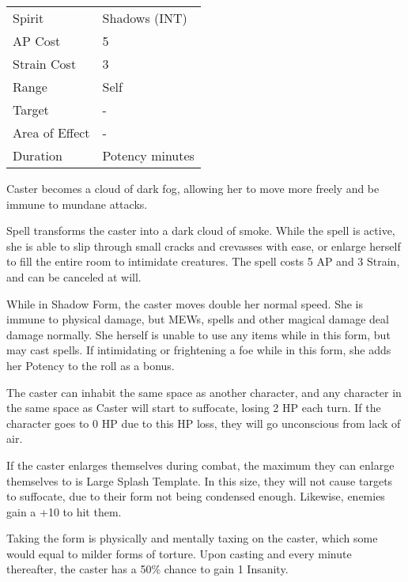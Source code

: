 \documentclass[11pt,a4paper,twocolumn]{book}
\begin{document}
{
	\begin{tabu} to 75mm{| X[l,4] | X[l,7] |}
		\hline
		Spirit 			& Shadows (INT) 		\\
		AP Cost	      	& 5 					\\
		Strain Cost     & 3 					\\
		Range     		& Self					\\
		Target      	& -						\\
		Area of Effect  & -  	 				\\
		Duration     	& Potency minutes		\\ \hline
	\end{tabu}
	
}

\medskip

Caster becomes a cloud of dark fog, allowing her to move more freely and be immune to mundane attacks. 	

Spell transforms the caster into a dark cloud of smoke. While the spell is active, she is able to slip through small cracks and crevasses with ease, or enlarge herself to fill the entire room to intimidate creatures. The spell costs 5 AP and 3 Strain, and can be canceled at will.

While in Shadow Form, the caster moves double her normal speed. She is immune to physical damage, but MEWs, spells and other magical damage deal damage normally. She herself is unable to use any items while in this form, but may cast spells. If intimidating or frightening a foe while in this form, she adds her Potency to the roll as a bonus.

The caster can inhabit the same space as another character, and any character in the same space as Caster will start to suffocate, losing 2 HP each turn. If the character goes to 0 HP due to this HP loss, they will go unconscious from lack of air.

If the caster enlarges themselves during combat, the maximum they can enlarge themselves to is Large Splash Template. In this size, they will not cause targets to suffocate, due to their form not being condensed enough. Likewise, enemies gain a +10 to hit them.

Taking the form is physically and mentally taxing on the caster, which some would equal to milder forms of torture. Upon casting and every minute thereafter, the caster has a 50\% chance to gain 1 Insanity.
\end{document}
